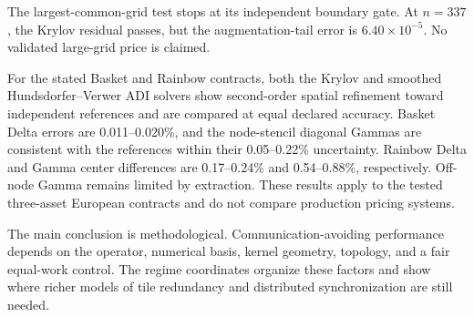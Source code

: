 The largest-common-grid test stops at its independent boundary gate. At $n=337$, the Krylov residual passes, but the augmentation-tail error is $6.40\times10^{-5}$. No validated large-grid price is claimed.

For the stated Basket and Rainbow contracts, both the Krylov and smoothed Hundsdorfer--Verwer ADI solvers show second-order spatial refinement toward independent references and are compared at equal declared accuracy. Basket Delta errors are 0.011--0.020\%, and the node-stencil diagonal Gammas are consistent with the references within their 0.05--0.22\% uncertainty. Rainbow Delta and Gamma center differences are 0.17--0.24\% and 0.54--0.88\%, respectively. Off-node Gamma remains limited by extraction. These results apply to the tested three-asset European contracts and do not compare production pricing systems.

The main conclusion is methodological. Communication-avoiding performance depends on the operator, numerical basis, kernel geometry, topology, and a fair equal-work control. The regime coordinates organize these factors and show where richer models of tile redundancy and distributed synchronization are still needed.
